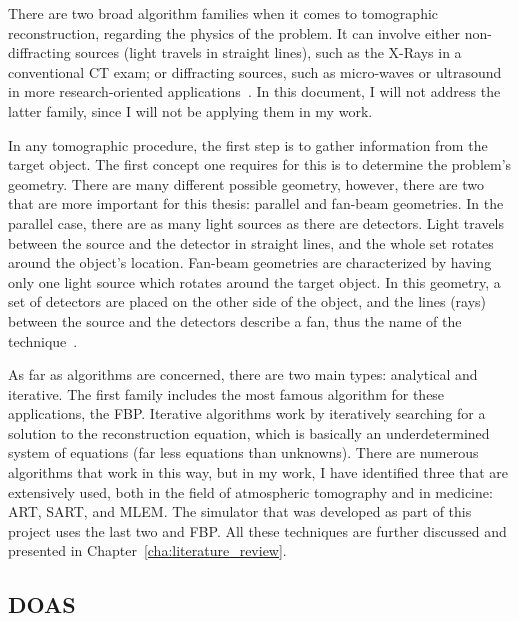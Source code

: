 There are two broad algorithm families when it comes to tomographic
reconstruction, regarding the physics of the problem. It can involve
either non-diffracting sources (light travels in straight lines), such
as the X-Rays in a conventional \gls{CT} exam; or diffracting sources,
such as micro-waves or ultrasound in more research-oriented
applications~\cite{Kak2001}. In this document, I will not address the
latter family, since I will not be applying them in my work.

In any tomographic procedure, the first step is to gather information
from the target object. The first concept one requires for this is to
determine the problem's geometry. There are many different possible
geometry, however, there are two that are more important for this
thesis: parallel and fan-beam geometries. In the parallel case, there
are as many light sources as there are detectors. Light travels between
the source and the detector in straight lines, and the whole set rotates
around the object's location. Fan-beam geometries are characterized by
having only one light source which rotates around the target object. In
this geometry, a set of detectors are placed on the other side of the
object, and the lines (rays) between the source and the detectors
describe a fan, thus the name of the technique~\cite{Herman2009,
Kak2001}.

As far as algorithms are concerned, there are two main types: analytical
and iterative. The first family includes the most famous algorithm for
these applications, the \gls{FBP}. Iterative algorithms work by
iteratively searching for a solution to the reconstruction equation,
which is basically an underdetermined system of equations (far less
equations than unknowns).  There are numerous algorithms that work in
this way, but in my work, I have identified three that are extensively
used, both in the field of atmospheric tomography and in medicine:
\gls{ART}, \gls{SART}, and \gls{MLEM}. The simulator that was developed
as part of this project uses the last two and \gls{FBP}. All these
techniques are further discussed and presented in
Chapter~\ref{cha:literature_review}.

\subsection{\gls{DOAS}}%
\label{sub:doas}

